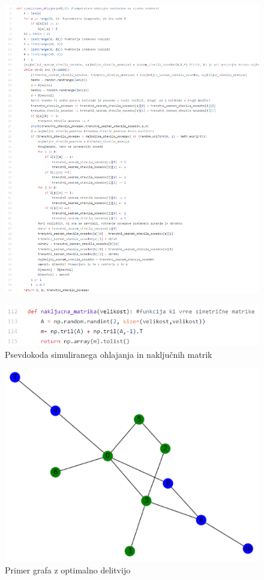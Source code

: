 \documentclass[12pt,a4paper]{amsart}
\theoremstyle{definition} %
\theoremstyle{plain} %
\begin{document}
\FloatBarrier
\begin{figure}
  \centering
  \includegraphics{simulirano}
\end{figure}
\FloatBarrier

\FloatBarrier
\begin{figure}
  \centering
  \includegraphics{matrike}
  \caption{Psevdokoda simuliranega ohlajanja in naključnih matrik}
\end{figure}

\begin{figure}
  \centering
  \includegraphics{primer_grafa}
 \caption{Primer grafa z optimalno delitvijo}
\end{figure}
\end{document}
